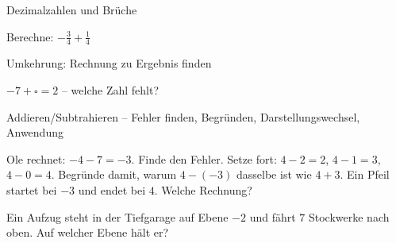\begin{aufgabe}{Dezimalzahlen und Brüche}
\begin{teile}
\teil Berechne: $-\frac{3}{4} + \frac{1}{4}$ \leerfeld
\end{teile}
\end{aufgabe}

\begin{aufgabe}{Umkehrung: Rechnung zu Ergebnis finden}
\begin{teile}
\teil $-7 + \square = 2$ – welche Zahl fehlt? \leerfeld
\end{teile}
\end{aufgabe}

\begin{aufgabe}{Addieren/Subtrahieren – Fehler finden, Begründen, Darstellungswechsel, Anwendung}
\begin{teile}
\teil Ole rechnet: $-4 - 7 = -3$. Finde den Fehler.
\teil Setze fort: $4 - 2 = 2$, $4 - 1 = 3$, $4 - 0 = 4$. Begründe damit, warum $4 - (-3)$ dasselbe ist wie $4 + 3$.
\teil Ein Pfeil startet bei $-3$ und endet bei $4$. Welche Rechnung?

\teil Ein Aufzug steht in der Tiefgarage auf Ebene $-2$ und fährt $7$ Stockwerke nach oben. Auf welcher Ebene hält er?
\end{teile}
\end{aufgabe}
